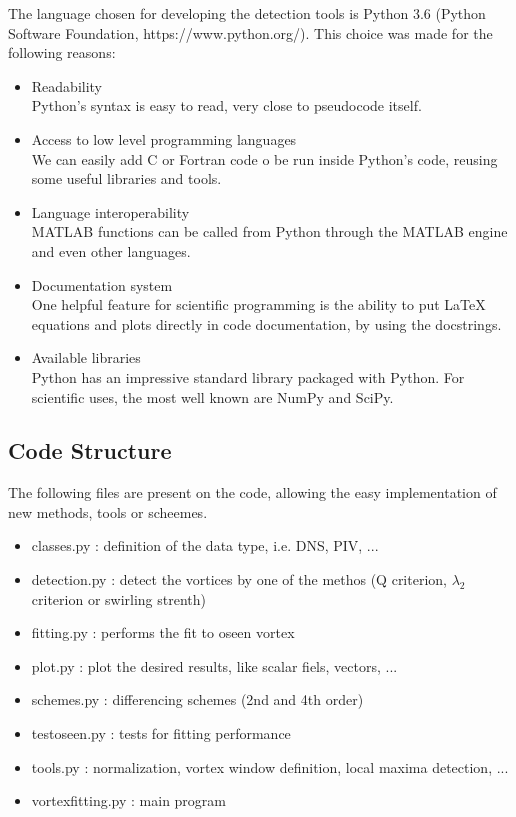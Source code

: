 \documentclass[12pt, a4paper, openany]{memoir}
\begin{document}
The language chosen for developing the detection tools is Python 3.6 (Python Software Foundation, https://www.python.org/). This choice was made for the following reasons:
\begin{itemize}
	\item Readability \\
	Python's syntax is easy to read, very close to pseudocode itself.
	\item Access to low level programming languages \\
	We can easily add C or Fortran code o be run inside Python's code, reusing some useful libraries and tools.
	\item Language interoperability \\
	MATLAB functions can be called from Python through the MATLAB engine and even other languages.
	\item Documentation system \\
	One helpful feature for scientific programming is the ability to put LaTeX equations and plots directly in code documentation, by using the docstrings.
	\item Available libraries \\
	Python has an impressive standard library packaged with Python. For scientific uses, the most well known are NumPy and SciPy.
\end{itemize} 

\subsection{Code Structure}

The following files are present on the code, allowing the easy implementation of new methods, tools or scheemes.

\begin{itemize}
	\item classes.py : definition of the data type, i.e. DNS, PIV, ...
	\item detection.py : detect the vortices by one of the methos (Q criterion, $\lambda_2$ criterion or swirling strenth)
	\item fitting.py : performs the fit to oseen vortex
	\item plot.py : plot the desired results, like scalar fiels, vectors, ...
	\item schemes.py : differencing schemes (2nd and 4th order)
	\item testoseen.py : tests for fitting performance
	\item tools.py : normalization, vortex window definition, local maxima detection, ... 
	\item vortexfitting.py : main program
\end{itemize}
\end{document}
